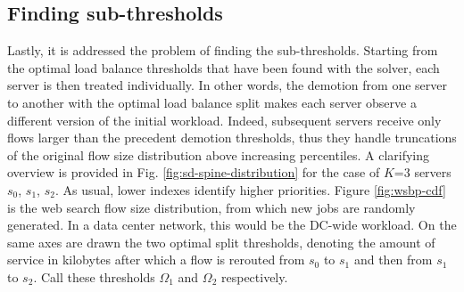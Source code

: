 \subsection{Finding sub-thresholds}
\label{sec:subthresh-with-sd}
Lastly, it is addressed the problem of finding the sub-thresholds. Starting from the optimal load balance thresholds that have been found with the solver, each server is then treated individually. In other words, the demotion from one server to another with the optimal load balance split makes each server observe a different version of the initial workload. Indeed, subsequent servers receive only flows larger than the precedent demotion thresholds, thus they handle truncations of the original flow size distribution above increasing percentiles. A clarifying overview is provided in Fig. \ref{fig:sd-spine-distribution} for the case of $K$=3 servers $s_0$, $s_1$, $s_2$. As usual, lower indexes identify higher priorities. Figure \ref{fig:wsbp-cdf} is the web search flow size distribution, from which new jobs are randomly generated. In a data center network, this would be the DC-wide workload. On the same axes are drawn the two optimal split thresholds, denoting the amount of service in kilobytes after which a flow is rerouted from $s_0$ to $s_1$ and then from $s_1$ to $s_2$. Call these thresholds $\Omega_1$ and $\Omega_2$ respectively. 
